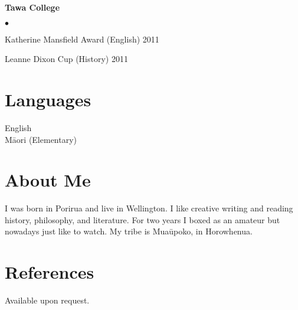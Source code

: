 \documentclass[margin,line]{res}
\newenvironment{list2}{
  \begin{list}{$\bullet$}{%
      \setlength{\itemsep}{0in}
      \setlength{\parsep}{0in} \setlength{\parskip}{0in}
      \setlength{\topsep}{0in} \setlength{\partopsep}{0in}
      \setlength{\leftmargin}{0.2in}}}
  {\end{list}}
\begin{document}
\begin{resume}
{\bf Tawa College}
\begin{list2}
	\item Katherine Mansfield Award (English) \hfill 2011
	\item Leanne Dixon Cup (History) \hfill 2011
\end{list2}

\section{\sc Languages}
English\\
M\=aori (Elementary)

\section{\sc About Me}
I was born in Porirua and live in Wellington. I like creative writing and reading history, philosophy, and literature. For two years I boxed as an amateur but nowadays just like to watch. My tribe is Mua\=upoko, in Horowhenua.

\section{\sc References}
Available upon request.

\end{resume}
\end{document}
